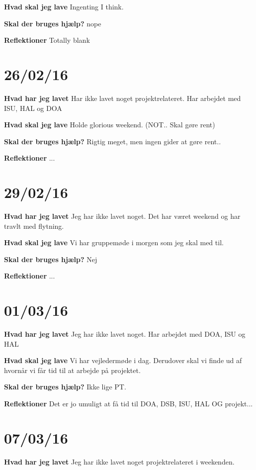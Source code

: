 \documentclass{article}
\begin{document}
	
	\textbf{Hvad skal jeg lave}
	Ingenting I think.
	
	
	\textbf{Skal der bruges hjælp?}
	nope
	
	\textbf{Reflektioner}
	Totally blank
	
	
	\section{26/02/16}
	
	\textbf{Hvad har jeg lavet}
	Har ikke lavet noget projektrelateret. Har arbejdet med ISU, HAL og DOA
	
	\textbf{Hvad skal jeg lave}
	Holde glorious weekend. (NOT.. Skal gøre rent)
	
	
	\textbf{Skal der bruges hjælp?}
	Rigtig meget, men ingen gider at gøre rent..
	
	\textbf{Reflektioner}
	...
	
	\section{29/02/16}
	
	\textbf{Hvad har jeg lavet}
	Jeg har ikke lavet noget. Det har været weekend og har travlt med flytning.
	
	\textbf{Hvad skal jeg lave}
	Vi har gruppemøde i morgen som jeg skal med til.
	
	\textbf{Skal der bruges hjælp?}
	Nej
	
	\textbf{Reflektioner}
	...
	
	\section{01/03/16}
	
	\textbf{Hvad har jeg lavet}
	Jeg har ikke lavet noget. Har arbejdet med DOA, ISU og HAL
	
	\textbf{Hvad skal jeg lave}
	Vi har vejledermøde i dag. Derudover skal vi finde ud af hvornår vi får tid til at arbejde på projektet. 
	
	\textbf{Skal der bruges hjælp?}
	Ikke lige PT.
	
	\textbf{Reflektioner}
	Det er jo umuligt at få tid til DOA, DSB, ISU, HAL OG projekt...
	
	\section{07/03/16}
	
	\textbf{Hvad har jeg lavet}
	Jeg har ikke lavet noget projektrelateret i weekenden.
	
\end{document}
